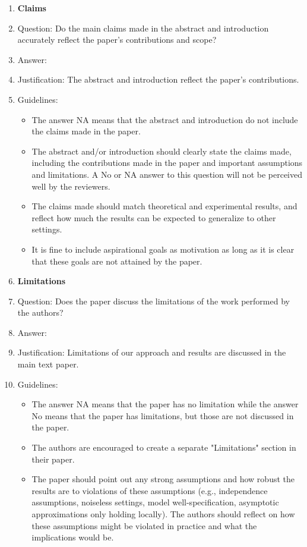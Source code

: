 \documentclass{article}
\begin{document}
\begin{enumerate}
\item {\bf Claims}
    \item[] Question: Do the main claims made in the abstract and introduction accurately reflect the paper's contributions and scope?
    \item[] Answer: \answerYes{}
    \item[] Justification: The abstract and introduction reflect the paper's contributions.
    \item[] Guidelines:
    \begin{itemize}
        \item The answer NA means that the abstract and introduction do not include the claims made in the paper.
        \item The abstract and/or introduction should clearly state the claims made, including the contributions made in the paper and important assumptions and limitations. A No or NA answer to this question will not be perceived well by the reviewers.
        \item The claims made should match theoretical and experimental results, and reflect how much the results can be expected to generalize to other settings.
        \item It is fine to include aspirational goals as motivation as long as it is clear that these goals are not attained by the paper.
    \end{itemize}
\item {\bf Limitations}
    \item[] Question: Does the paper discuss the limitations of the work performed by the authors?
    \item[] Answer: \answerYes{}
    \item[] Justification: Limitations of our approach and results are discussed in the main text paper.
    \item[] Guidelines:
    \begin{itemize}
        \item The answer NA means that the paper has no limitation while the answer No means that the paper has limitations, but those are not discussed in the paper.
        \item The authors are encouraged to create a separate "Limitations" section in their paper.
        \item The paper should point out any strong assumptions and how robust the results are to violations of these assumptions (e.g., independence assumptions, noiseless settings, model well-specification, asymptotic approximations only holding locally). The authors should reflect on how these assumptions might be violated in practice and what the implications would be.

\end{itemize}
\end{enumerate}
\end{document}
